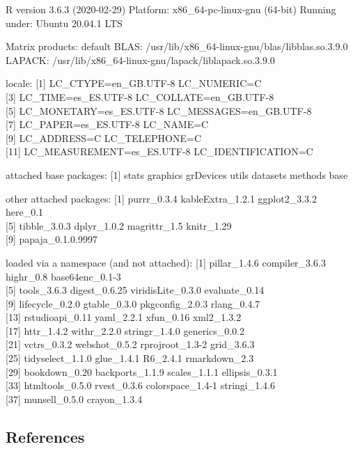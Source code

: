 \documentclass[
  english,
  man,man,floatsintext]{apa6}
\begin{document}
\begin{appendix}
R version 3.6.3 (2020-02-29) Platform: x86\_64-pc-linux-gnu (64-bit)
Running under: Ubuntu 20.04.1 LTS

Matrix products: default BLAS:
/usr/lib/x86\_64-linux-gnu/blas/libblas.so.3.9.0 LAPACK:
/usr/lib/x86\_64-linux-gnu/lapack/liblapack.so.3.9.0

locale: {[}1{]} LC\_CTYPE=en\_GB.UTF-8 LC\_NUMERIC=C\\
{[}3{]} LC\_TIME=es\_ES.UTF-8 LC\_COLLATE=en\_GB.UTF-8\\
{[}5{]} LC\_MONETARY=es\_ES.UTF-8 LC\_MESSAGES=en\_GB.UTF-8\\
{[}7{]} LC\_PAPER=es\_ES.UTF-8 LC\_NAME=C\\
{[}9{]} LC\_ADDRESS=C LC\_TELEPHONE=C\\
{[}11{]} LC\_MEASUREMENT=es\_ES.UTF-8 LC\_IDENTIFICATION=C

attached base packages: {[}1{]} stats graphics grDevices utils datasets
methods base

other attached packages: {[}1{]} purrr\_0.3.4 kableExtra\_1.2.1
ggplot2\_3.3.2 here\_0.1\\
{[}5{]} tibble\_3.0.3 dplyr\_1.0.2 magrittr\_1.5 knitr\_1.29\\
{[}9{]} papaja\_0.1.0.9997

loaded via a namespace (and not attached): {[}1{]} pillar\_1.4.6
compiler\_3.6.3 highr\_0.8 base64enc\_0.1-3\\
{[}5{]} tools\_3.6.3 digest\_0.6.25 viridisLite\_0.3.0 evaluate\_0.14\\
{[}9{]} lifecycle\_0.2.0 gtable\_0.3.0 pkgconfig\_2.0.3 rlang\_0.4.7\\
{[}13{]} rstudioapi\_0.11 yaml\_2.2.1 xfun\_0.16 xml2\_1.3.2\\
{[}17{]} httr\_1.4.2 withr\_2.2.0 stringr\_1.4.0 generics\_0.0.2\\
{[}21{]} vctrs\_0.3.2 webshot\_0.5.2 rprojroot\_1.3-2 grid\_3.6.3\\
{[}25{]} tidyselect\_1.1.0 glue\_1.4.1 R6\_2.4.1 rmarkdown\_2.3\\
{[}29{]} bookdown\_0.20 backports\_1.1.9 scales\_1.1.1 ellipsis\_0.3.1\\
{[}33{]} htmltools\_0.5.0 rvest\_0.3.6 colorspace\_1.4-1
stringi\_1.4.6\\
{[}37{]} munsell\_0.5.0 crayon\_1.3.4

\hypertarget{references}{%
\subsection*{References}\label{references}}


\end{appendix}
\end{document}
